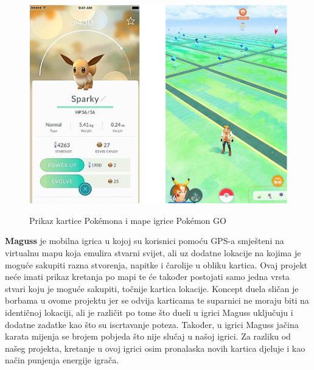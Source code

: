 		\begin{figure}[H]
			\centering
			\includegraphics[scale=0.6]{slike/PokemonGO} \\%
			\caption{Prikaz kartice Pokémona i mape igrice Pokémon GO}
			\label{fig:PokemonGO} %
		\end{figure}
	
		\textnormal{\textbf{Maguss} je mobilna igrica u kojoj su korisnici pomoću GPS-a smješteni na virtualnu mapu koja emulira stvarni svijet, ali uz dodatne lokacije na kojima je moguće sakupiti razna stvorenja, napitke i čarolije u obliku kartica. Ovaj projekt neće imati prikaz kretanja po mapi te će također postojati samo jedna vrsta stvari koju je moguće sakupiti, točnije kartica lokacije. Koncept duela sličan je borbama u ovome projektu jer se odvija karticama te suparnici ne moraju biti na identičnoj lokaciji, ali je različit po tome što dueli u igrici Maguss uključuju i dodatne zadatke kao što su iscrtavanje poteza. Također, u igrici Maguss jačina karata mijenja se brojem pobjeda što nije slučaj u našoj igrici. Za razliku od našeg projekta, kretanje u ovoj igrici osim pronalaska novih kartica djeluje i kao način punjenja energije igrača.}\\
		
